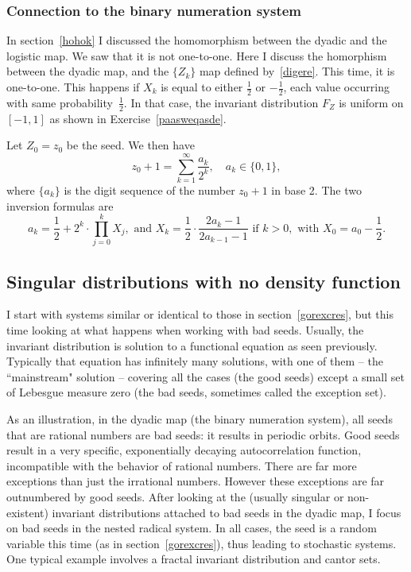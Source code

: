 \documentclass[oneside,10pt]{book}
\begin{document}
\subsubsection{Connection to the binary numeration system}\label{pornicsew}

In section~\ref{hohok} I discussed the \textcolor{index}{homomorphism} between the dyadic and the logistic map. 
 We saw that it is not one-to-one. Here I discuss the homorphism between the dyadic map, and the $\{Z_k\}$ map
 defined by~\ref{digere}. This time, it is one-to-one. This happens if $X_k$ is equal to either $\frac{1}{2}$ or $-\frac{1}{2}$, each value occurring with same probability~$\frac{1}{2}$. In that case, the invariant distribution $F_Z$ is uniform on $[-1, 1]$ as 
 shown in Exercise~\ref{paasweqasde}.

\noindent Let $Z_0 = z_0$ be the seed. We then have
$$
z_0 + 1 = \sum_{k=1}^\infty \frac{a_k}{2^k}, \quad  a_k\in\{0, 1\},
$$
where $\{a_k\}$ is the digit sequence of the number $z_0+ 1$ in base 2. The two inversion formulas are
$$
a_k  = \frac{1}{2}+ 2^k \cdot \prod_{j=0}^k X_j, \text{ and }
X_k  = \frac{1}{2}\cdot \frac{2a_k -1}{2a_{k-1} -1} \text{ if } k>0, \text{ with } X_0 = a_0 -\frac{1}{2}. 
$$

\subsection{Singular distributions with no density function}\label{nodensity}

I start with systems similar or identical to those in section~\ref{gorexcres}, but this time looking at what happens when working
  with \textcolor{index}{bad seeds}. Usually, the invariant distribution is solution 
 to a \textcolor{index}{functional equation} as seen previously. Typically that equation has
 infinitely many solutions, with one of them -- the ``mainstream" solution -- covering all the cases (the good seeds) except a small
 set of Lebesgue measure zero (the bad seeds, sometimes called the \textcolor{index}{exception set}). 

As an illustration, in the dyadic map (the binary numeration system), all seeds that are rational numbers are bad seeds: it results
 in periodic orbits. Good seeds result in a very specific, exponentially decaying autocorrelation function, incompatible with the behavior of rational numbers. There are far more exceptions than just the irrational numbers. However these exceptions are far outnumbered by good seeds. After looking at the (usually singular or non-existent) invariant distributions attached to bad seeds in the dyadic map, I focus on bad seeds in 
 the nested radical system. In all cases, the seed is a random variable this time (as in section~\ref{gorexcres}), thus leading to stochastic systems. One typical example involves a fractal invariant distribution and cantor sets.
\end{document}

